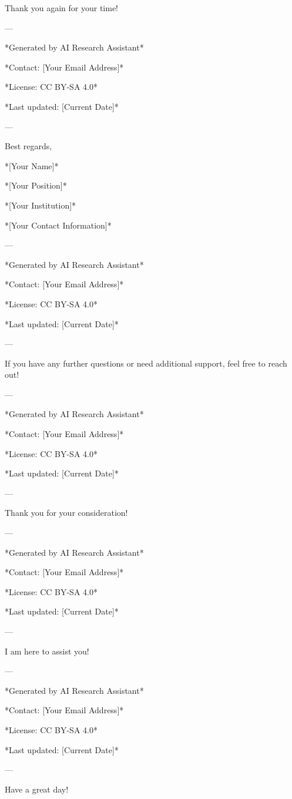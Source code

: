 Thank you again for your time! 

--- 

*Generated by AI Research Assistant* 

*Contact: [Your Email Address]* 

*License: CC BY-SA 4.0* 

*Last updated: [Current Date]* 

--- 

Best regards, 

*[Your Name]* 

*[Your Position]* 

*[Your Institution]* 

*[Your Contact Information]* 

--- 

*Generated by AI Research Assistant* 

*Contact: [Your Email Address]* 

*License: CC BY-SA 4.0* 

*Last updated: [Current Date]* 

--- 

If you have any further questions or need additional support, feel free to reach out! 

--- 

*Generated by AI Research Assistant* 

*Contact: [Your Email Address]* 

*License: CC BY-SA 4.0* 

*Last updated: [Current Date]* 

--- 

Thank you for your consideration! 

--- 

*Generated by AI Research Assistant* 

*Contact: [Your Email Address]* 

*License: CC BY-SA 4.0* 

*Last updated: [Current Date]* 

--- 

I am here to assist you! 

--- 

*Generated by AI Research Assistant* 

*Contact: [Your Email Address]* 

*License: CC BY-SA 4.0* 

*Last updated: [Current Date]* 

--- 

Have a great day! 

